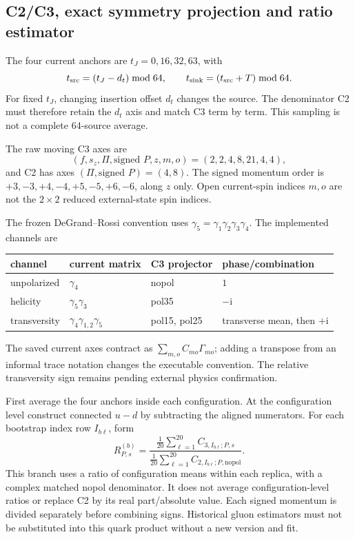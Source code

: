 \documentclass[11pt]{article}
\numberwithin{equation}{section}
\newcommand{\ii}{\mathrm{i}}
\begin{document}
\subsection{C2/C3, exact symmetry projection and ratio estimator}

The four current anchors are \(t_J=0,16,32,63\), with
\begin{equation}
 t_{\rm src}=(t_J-d_t)\bmod64,\qquad
 t_{\rm sink}=(t_{\rm src}+T)\bmod64 .
\label{eq:l32x64-current-source-map}
\end{equation}
For fixed \(t_J\), changing insertion offset \(d_t\) changes the source.
The denominator C2 must therefore retain the \(d_t\) axis and match C3
term by term.  This sampling is not a complete 64-source average.

The raw moving C3 axes are
\[
 (f,s_z,\Pi,\text{signed }P,z,m,o)=(2,2,4,8,21,4,4),
\]
and C2 has axes \((\Pi,\text{signed }P)=(4,8)\).
The signed momentum order is \(+3,-3,+4,-4,+5,-5,+6,-6\), along \(z\)
only.  Open current-spin indices \(m,o\) are not the \(2\times2\)
reduced external-state spin indices.

The frozen DeGrand--Rossi convention uses
\(\gamma_5=\gamma_1\gamma_2\gamma_3\gamma_4\).  The implemented channels are
\begin{center}
\begin{tabular}{@{}llll@{}}
\toprule
channel & current matrix & C3 projector & phase/combination\\
\midrule
unpolarized & \(\gamma_4\) & nopol & \(1\)\\
helicity & \(\gamma_5\gamma_3\) & pol35 & \(-\ii\)\\
transversity & \(\gamma_4\gamma_{1,2}\gamma_5\) & pol15, pol25
 & transverse mean, then \(+\ii\)\\
\bottomrule
\end{tabular}
\end{center}
The saved current axes contract as
\(\sum_{m,o}C_{mo}\Gamma_{mo}\); adding a transpose from an informal
trace notation changes the executable convention.
The relative transversity sign remains pending external physics
confirmation.

First average the four anchors inside each configuration.  At the
configuration level construct connected \(u-d\) by subtracting the
aligned numerators.  For each bootstrap index row \(I_{b\ell}\), form
\begin{equation}
 R^{(b)}_{P,s}
 =\frac{\frac1{20}\sum_{\ell=1}^{20}C_{3,I_{b\ell};P,s}}
 {\frac1{20}\sum_{\ell=1}^{20}C_{2,I_{b\ell};P,\mathrm{nopol}}}.
\label{eq:l32x64-ratio-of-means}
\end{equation}
This branch uses a ratio of configuration means within each replica,
with a complex matched nopol denominator.  It does not average
configuration-level ratios or replace C2 by its real part/absolute value.
Each signed momentum is divided separately before combining signs.
Historical gluon estimators must not be substituted into this quark
product without a new version and fit.
\end{document}
